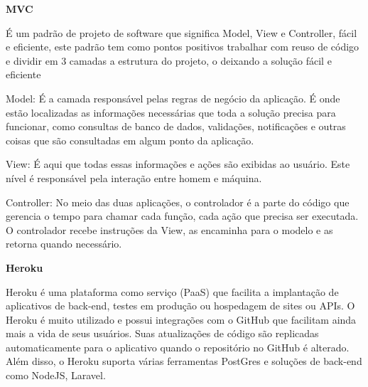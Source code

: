 	\textbf{MVC}
	
	É um padrão de projeto de software que significa Model, View e Controller, fácil e eficiente, este padrão tem como pontos positivos trabalhar com reuso de código e dividir em 3 camadas a estrutura do projeto, o deixando a solução fácil e eficiente
	
	Model:  %
	É a camada responsável pelas regras de negócio da aplicação. É onde estão localizadas as informações necessárias que toda a solução precisa para funcionar, como consultas de banco de dados, validações, notificações e outras coisas que são consultadas em algum ponto da aplicação.
	
	View:  %
	É aqui que todas essas informações e ações são exibidas ao usuário. Este nível é responsável pela interação entre homem e máquina.
	
	Controller: %
	No meio das duas aplicações, o controlador é a parte do código que gerencia o tempo para chamar cada função, cada ação que precisa ser executada. O controlador recebe instruções da View, as encaminha para o modelo e as retorna quando necessário.
	
	
	\textbf{Heroku}
	
	Heroku é uma plataforma como serviço (PaaS) que facilita a implantação de aplicativos de back-end, testes em produção ou hospedagem de sites ou APIs. O Heroku é muito utilizado e possui integrações com o GitHub que facilitam ainda mais a vida de seus usuários. Suas atualizações de código são replicadas automaticamente para o aplicativo quando o repositório no GitHub é alterado. Além disso, o Heroku suporta várias ferramentas PostGres e soluções de back-end como NodeJS, Laravel.
	
